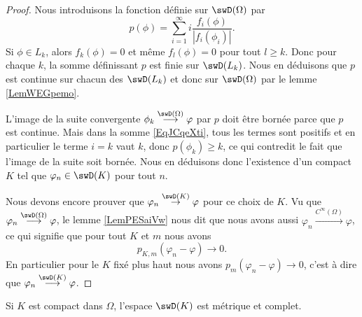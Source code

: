 \begin{proof}
    Nous introduisons la fonction définie sur \( \swD(\Omega)\) par
    \begin{equation}    \label{EqJCqeXti}
        p(\phi)=\sum_{i=1}^{\infty}i\frac{ f_i(\phi) }{ | f_i(\phi_i) | }.
    \end{equation}
    Si \( \phi\in L_k\), alors \( f_k(\phi)=0\) et même \( f_{l}(\phi)=0\) pour tout \( l\geq k\). Donc pour chaque \( k\), la somme définissant \( p\) est finie sur \( \swD(L_k)\). Nous en déduisons que \( p\) est continue sur chacun des \( \swD(L_k)\) et donc sur \( \swD(\Omega)\) par le lemme \ref{LemWEGpemo}.

    L'image de la suite convergente \( \phi_k\stackrel{\swD(\Omega)}{\longrightarrow}\varphi\) par \( p\) doit être bornée parce que \( p\) est continue. Mais dans la somme  \eqref{EqJCqeXti}, tous les termes sont positifs et en particulier le terme \( i=k\) vaut \( k\), donc \( p(\phi_k)\geq k\), ce qui contredit le fait que l'image de la suite soit bornée. Nous en déduisons donc l'existence d'un compact \( K\) tel que \( \varphi_n\in \swD(K)\) pour tout \( n\).

    Nous devons encore prouver que \( \varphi_n\stackrel{\swD(K)}{\to}\varphi\) pour ce choix de \( K\). Vu que \( \varphi_n\stackrel{\swD(\Omega)}{\longrightarrow}\varphi\), le lemme \ref{LemPESaiVw} nous dit que nous avons aussi \( \varphi_n\stackrel{ C^{\infty}(\Omega)}{\longrightarrow}\varphi\), ce qui signifie que pour tout \( K\) et \( m\) nous avons
    \begin{equation}
        p_{K,m}(\varphi_n-\varphi)\to 0.
    \end{equation}
    En particulier pour le \( K\) fixé plus haut nous avons \( p_m(\varphi_n-\varphi)\to 0\), c'est à dire que \( \varphi_n\stackrel{\swD(K)}{\longrightarrow}\varphi\).
    
\end{proof}


\begin{proposition} \label{PropQAEVcTi}
    Si \( K\) est compact dans \( \Omega\), l'espace \( \swD(K)\) est métrique et complet.
\end{proposition}

